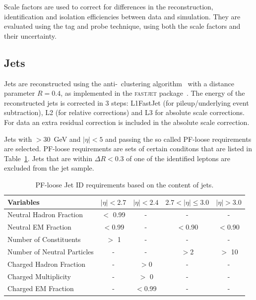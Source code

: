 Scale factors are used to correct for differences in the reconstruction, identification and isolation efficiencies between data and simulation. They are evaluated using the tag and probe technique, using both the scale factors and their uncertainty.

\subsection{Jets}
\label{subsec:jets}
Jets are reconstructed using the anti-\kt~clustering algorithm~\cite{antikt}  with a distance parameter $R=0.4$, as implemented in the \textsc{fastjet}  package~\cite{Cacciari:fastjet1,Cacciari:fastjet2}. The energy of the reconstructed jets is corrected in 3 steps: L1FastJet (for pileup/underlying event subtraction), L2 (for relative corrections) and L3 for absolute scale corrections. For data an extra residual correction is included in the absolute scale correction.

Jets with \pt$>$30~GeV and $|\eta|<5$ and passing the so called PF-loose requirements are selected. PF-loose requirements are sets of certain conditons that are listed in Table~\ref{Table:pf-jet-loose-id}. Jets that are within $\Delta R < 0.3$ of one of the identified leptons are excluded from the jet sample. 
%
\begin{table}
\centering
\begin{tabular}[!htbp]{l c c c c}
\hline
{\textbf{Variables}}      &   $|\eta|<2.7$ & $|\eta|<2.4$  & $2.7 < |\eta| \leq 3.0$  & $|\eta| > 3.0$    \\
\hline
Neutral Hadron Fraction   &$   <$ 0.99  & -       & -       & -     \\
Neutral EM Fraction       &   $< $0.99  & -       & $< $0.90  & $< $0.90\\
Number of Constituents    &$   >$ 1     & -       & -       & -     \\
Number of Neutral Particles & -       & -       & $> $2     &$ >$ 10  \\
Charged Hadron Fraction   &   -       & $> $0     & -       & -     \\
Charged Multiplicity      &   -       &$ >$ 0     & -       & -     \\
Charged EM Fraction       &   -       & $< $0.99  & -       & -     \\
\hline
\end{tabular}
\caption{PF-loose Jet ID requirements based on the content of jets.}
\label{Table:pf-jet-loose-id}
\end{table}
%

